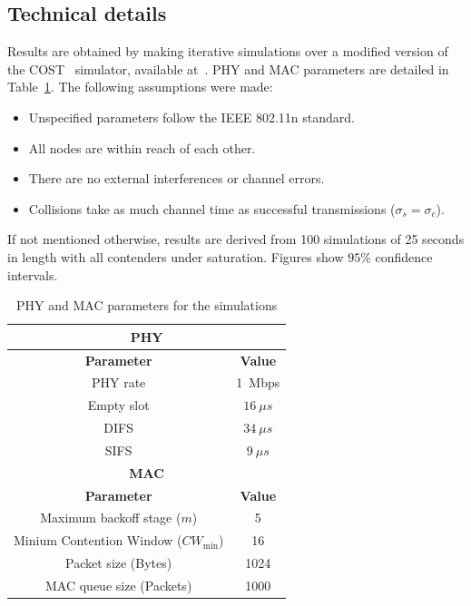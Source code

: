 \documentclass[a4paper,journal]{IEEEtran}
\begin{document}

	\subsection{Technical details}
	Results are obtained by making iterative simulations over a modified version of the COST~\cite{COST} simulator, available at~\cite{sim:parameters}. PHY and MAC parameters are detailed in Table~\ref{tab:mac-params}. The following assumptions were made:
	
	\begin{itemize}
		\item Unspecified parameters follow the IEEE 802.11n standard.
		\item All nodes are within reach of each other.
		\item There are no external interferences or channel errors.
		\item Collisions take as much channel time as successful transmissions ($\sigma_{s}=\sigma_{c}$).
	\end{itemize}
	
	If not mentioned otherwise, results are derived from 100 simulations of 25 seconds in length with all contenders under saturation. Figures show $95$\% confidence intervals.
	
	\begin{table}
		\centering
		\caption{PHY and MAC parameters for the simulations}
		\label{tab:mac-params}
		\begin{tabular}{|c|c|}
			\hline
			\multicolumn{2}{|c|}{{\bfseries PHY}}\\
			\hline
			{\bfseries Parameter} & {\bfseries Value}\\
			\hline
			PHY rate & 1~Mbps\\
			Empty slot & $16~\mu s$\\
			DIFS & $34~\mu s$\\
			SIFS & $9~\mu s$\\
			\hline
			\multicolumn{2}{|c|}{{\bfseries MAC}}\\
			\hline
			{\bfseries Parameter} & {\bfseries Value}\\
			\hline
			Maximum backoff stage ($m$) & 5\\
			Minium Contention Window ($CW_{\min}$) & 16\\
			Packet size (Bytes) & 1024\\
			MAC queue size (Packets) & 1000\\
			\hline
		\end{tabular}
	\end{table}
	
\end{document}
